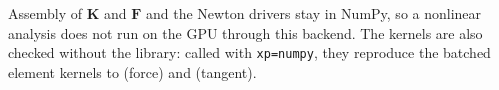\begin{hllimit}Assembly of $\bm K$ and $\bm F$ and the Newton drivers stay in NumPy, so a nonlinear analysis does not run on the GPU through this backend. The kernels are also checked without the library: called with \texttt{xp=numpy}, they reproduce the batched element kernels to \bktShadowForce{} (force) and \bktShadowTangent{} (tangent).\end{hllimit}

